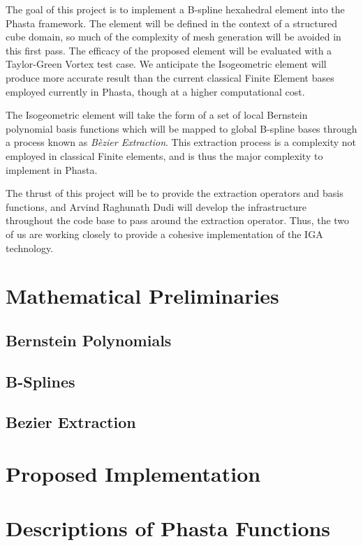 \documentclass[preprint,1p,12pt]{elsarticle}
\begin{document}
The goal of this project is to implement a B-spline hexahedral element into the Phasta framework. The element will be defined in the context of a structured cube domain, so much of the complexity of mesh generation will be avoided in this first pass. The efficacy of the proposed element will be evaluated with a Taylor-Green Vortex test case. We anticipate the Isogeometric element will produce more accurate result than the current classical Finite Element bases employed currently in Phasta, though at a higher computational cost. 

The Isogeometric element will take the form of a set of local Bernstein polynomial basis functions which will be mapped to global B-spline bases through a process known as \textit{B\`{e}zier Extraction}. This extraction process is a complexity not employed in classical Finite elements, and is thus the major complexity to implement in Phasta. 

The thrust of this project will be to provide the extraction operators and basis functions, and Arvind Raghunath Dudi will develop the infrastructure throughout the code base to pass around the extraction operator. Thus, the two of us are working closely to provide a cohesive implementation of the IGA technology. 

\section{Mathematical Preliminaries}
\subsection{Bernstein Polynomials}


\subsection{B-Splines}


\subsection{Bezier Extraction}


\section{Proposed Implementation}


\section{Descriptions of Phasta Functions}

\end{document}
